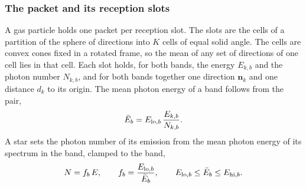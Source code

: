 \subsubsection{The packet and its reception slots}
\label{sec:packet-state}

A gas particle holds one packet per reception slot. The slots are the cells of a
partition of the sphere of directions into $K$ cells of equal solid angle. The
cells are convex cones fixed in a rotated frame, so the mean of any set of
directions of one cell lies in that cell. Each slot holds, for both bands, the
energy $E_{k,b}$ and the photon number $N_{k,b}$, and for both bands together
one direction $\boldsymbol{n}_k$ and one distance $d_k$ to its origin. The mean photon energy
of a band follows from the pair,
\begin{equation}
  \bar E_b = E_{{\rm lo},b}\,\frac{E_{k,b}}{N_{k,b}}.
  \label{eq:packet-meanE}
\end{equation}
A star sets the photon number of its emission from the mean photon energy
of its spectrum in the band, clamped to the band,
\begin{equation}
  N = f_b\,E, \qquad f_b=\frac{E_{{\rm lo},b}}{\bar E_b}, \qquad
  E_{{\rm lo},b}\le \bar E_b\le E_{{\rm hi},b}.
  \label{eq:packet-photonfrac}
\end{equation}


